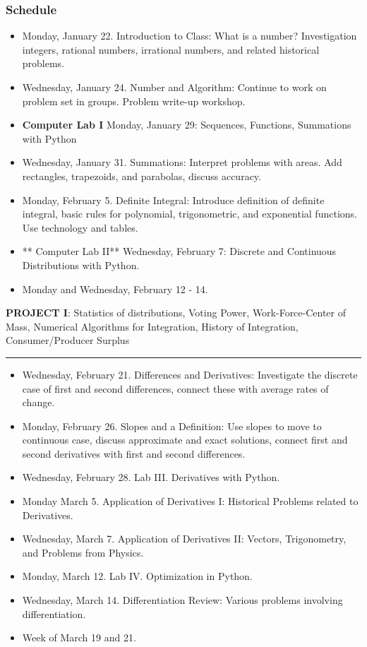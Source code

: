 \documentclass[11pt]{article}
\begin{document}
\subsubsection{Schedule}\label{schedule}

\begin{itemize}
\item
  Monday, January 22. Introduction to Class: What is a number?
  Investigation integers, rational numbers, irrational numbers, and
  related historical problems.
\item
  Wednesday, January 24. Number and Algorithm: Continue to work on
  problem set in groups. Problem write-up workshop.
\item
  \textbf{Computer Lab I} Monday, January 29: Sequences, Functions,
  Summations with Python
\item
  Wednesday, January 31. Summations: Interpret problems with areas. Add
  rectangles, trapezoids, and parabolas, discuss accuracy.
\item
  Monday, February 5. Definite Integral: Introduce definition of
  definite integral, basic rules for polynomial, trigonometric, and
  exponential functions. Use technology and tables.
\item
  ** Computer Lab II** Wednesday, February 7: Discrete and Continuous
  Distributions with Python.
\item
  Monday and Wednesday, February 12 - 14.
\end{itemize}

\textbf{PROJECT I}: Statistics of distributions, Voting Power,
Work-Force-Center of Mass, Numerical Algorithms for Integration, History
of Integration, Consumer/Producer Surplus

\begin{center}\rule{0.5\linewidth}{\linethickness}\end{center}

\begin{itemize}
\item
  Wednesday, February 21. Differences and Derivatives: Investigate the
  discrete case of first and second differences, connect these with
  average rates of change.
\item
  Monday, February 26. Slopes and a Definition: Use slopes to move to
  continuous case, discuss approximate and exact solutions, connect
  first and second derivatives with first and second differences.
\item
  Wednesday, February 28. Lab III. Derivatives with Python.
\item
  Monday March 5. Application of Derivatives I: Historical Problems
  related to Derivatives.
\item
  Wednesday, March 7. Application of Derivatives II: Vectors,
  Trigonometry, and Problems from Physics.
\item
  Monday, March 12. Lab IV. Optimization in Python.
\item
  Wednesday, March 14. Differentiation Review: Various problems
  involving differentiation.
\item
  Week of March 19 and 21.
\end{itemize}
\end{document}
